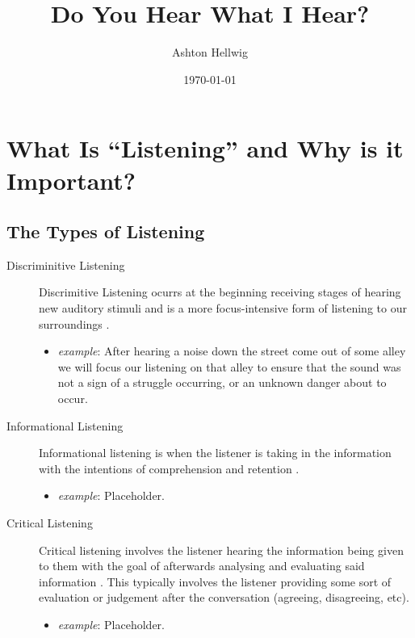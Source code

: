 \documentclass[stu,12pt]{apa7}
\title{%
    Do You Hear What I Hear?
  }
\author{Ashton Hellwig}
\date{\today}
\begin{document}
  \maketitle


  \section{What Is ``Listening'' and Why is it Important?}
    \subsection{The Types of Listening}
      \begin{description}
        \item[Discriminitive Listening]
          Discrimitive Listening ocurrs at the beginning receiving stages of
            hearing new auditory stimuli and is a more focus-intensive form
            of listening to our surroundings
            \parencite[pp. 333]{noauthor_communication_2013}.
          \begin{itemize}
            \item \textit{example}: After hearing a noise down the street come
              out of some alley we will focus our listening on that alley to
              ensure that the sound was not a sign of a struggle occurring, or
              an unknown danger about to occur.
          \end{itemize}
        \item[Informational Listening]
          Informational listening is when the listener is taking in the
            information with the intentions of comprehension and retention
            \parencite[pp. 334]{noauthor_communication_2013}.
          \begin{itemize}
            \item \textit{example}: Placeholder.
          \end{itemize}
        \item[Critical Listening]
          Critical listening involves the listener hearing the information being
            given to them with the goal of afterwards analysing and evaluating
            said information
            \parencite[pp. 334--335]{noauthor_communication_2013}. This
            typically involves the listener providing some sort of evaluation or
            judgement after the conversation (agreeing, disagreeing, etc).
          \begin{itemize}
            \item \textit{example}: Placeholder.

\end{itemize}
\end{description}
\end{document}
